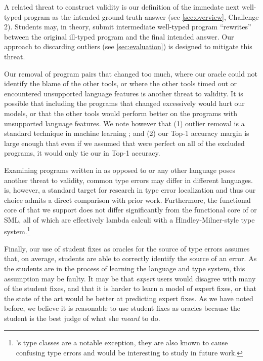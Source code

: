 A related threat to construct validity is our definition of the immedate
next well-typed program as the intended ground truth answer (see
\autoref{sec:overview}, Challenge 2). Students may, in theory, submit
intermediate well-typed program ``rewrites'' between the original ill-typed
program and the final intended answer. Our approach to discarding outliers
(see \autoref{sec:evaluation}) is designed to mitigate this threat. 

Our removal of program pairs that changed too much, where our oracle
could not identify the blame of the other tools, or where the other
tools timed out or encountered unsupported language features is another
threat to validity.
%
It is possible that including the programs that changed excessively
would hurt our models, or that the other tools would perform
better on the programs with unsupported language features.
%
We note however that
%
(1) outlier removal is a standard technique in machine learning
; and
%
(2) our Top-1 accuracy margin is large enough that even if we assumed
that \sherrloc were perfect on all of the excluded programs, it would
only tie our \hiddenFH in Top-1 accuracy.
%

Examining programs written in \ocaml as opposed to \haskell or any other
language poses another threat to validity, common type errors may differ
in different languages.
%
\ocaml is, however, a standard target for research in type error
localization and thus our choice admits a direct comparison with prior
work.
%
Furthermore, the functional core of \ocaml that we support does not
differ significantly from the functional core of \haskell or SML, all of
which are effectively lambda calculi with a Hindley-Milner-style type
system.\footnote{\haskell's type classes are a notable exception, they
  are also known to cause confusing type errors and would be interesting
  to study in future work.}

Finally, our use of student fixes as oracles for the source of type
errors assumes that, on average, students are able to correctly identify
the source of an error.
%
As the students are in the process of learning the language and type
system, this assumption may be faulty.
%
It may be that \emph{expert} users would disagree with many of the
student fixes, and that it is harder to learn a model of expert fixes,
or that the state of the art would be better at predicting expert fixes.
%
As we have noted before, we believe it is reasonable to use student
fixes as oracles because the student is the best judge of what she
\emph{meant} to do.



